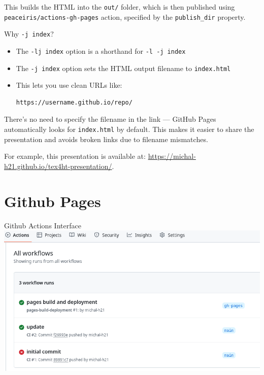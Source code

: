 This builds the HTML into the \texttt{out/} folder, which is then published
using \texttt{peaceiris/actions-gh-pages} action, specified by the
\texttt{publish_dir} property.

\begin{frame}[fragile]{Why \texttt{-j index}?}
\begin{itemize}
  \item The \texttt{-lj index} option is a shorthand for \texttt{-l -j index}
  \item The \texttt{-j index} option sets the HTML output filename to \texttt{index.html}
  \item This lets you use clean URLs like:
  
\begin{verbatim}
https://username.github.io/repo/
\end{verbatim}

\end{itemize}
\end{frame}

There's no need to specify the filename in the link — GitHub Pages
automatically looks for \texttt{index.html} by default. This makes it easier to share
the presentation and avoids broken links due to filename mismatches.

For example, this presentation is available at: \url{https://michal-h21.github.io/tex4ht-presentation/}.

\section{Github Pages}

\begin{frame}[fragile]{Github Actions Interface}
  \includegraphics{img/github-actions.png}
\end{frame}

